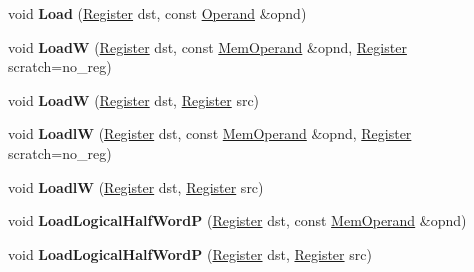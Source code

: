 \begin{DoxyCompactItemize}
void {\bfseries Load} (\mbox{\hyperlink{classv8_1_1internal_1_1Register}{Register}} dst, const \mbox{\hyperlink{classv8_1_1internal_1_1Operand}{Operand}} \&opnd)
\item 
\mbox{\label{classv8_1_1internal_1_1TurboAssembler_afdb1a51d938f30652c45732f9852b8ac}} 
void {\bfseries LoadW} (\mbox{\hyperlink{classv8_1_1internal_1_1Register}{Register}} dst, const \mbox{\hyperlink{classv8_1_1internal_1_1MemOperand}{Mem\+Operand}} \&opnd, \mbox{\hyperlink{classv8_1_1internal_1_1Register}{Register}} scratch=no\+\_\+reg)
\item 
\mbox{\label{classv8_1_1internal_1_1TurboAssembler_a842ef696144bed512dc1a2219dfb05cf}} 
void {\bfseries LoadW} (\mbox{\hyperlink{classv8_1_1internal_1_1Register}{Register}} dst, \mbox{\hyperlink{classv8_1_1internal_1_1Register}{Register}} src)
\item 
\mbox{\label{classv8_1_1internal_1_1TurboAssembler_a7800ca61cc697b18bc92cae0ee6bd5ea}} 
void {\bfseries LoadlW} (\mbox{\hyperlink{classv8_1_1internal_1_1Register}{Register}} dst, const \mbox{\hyperlink{classv8_1_1internal_1_1MemOperand}{Mem\+Operand}} \&opnd, \mbox{\hyperlink{classv8_1_1internal_1_1Register}{Register}} scratch=no\+\_\+reg)
\item 
\mbox{\label{classv8_1_1internal_1_1TurboAssembler_a8e4ca0a38f8dd9f6b69e19e218dfc075}} 
void {\bfseries LoadlW} (\mbox{\hyperlink{classv8_1_1internal_1_1Register}{Register}} dst, \mbox{\hyperlink{classv8_1_1internal_1_1Register}{Register}} src)
\item 
\mbox{\label{classv8_1_1internal_1_1TurboAssembler_ad082c5b7f2f91bc96eca6763722cdc6b}} 
void {\bfseries Load\+Logical\+Half\+WordP} (\mbox{\hyperlink{classv8_1_1internal_1_1Register}{Register}} dst, const \mbox{\hyperlink{classv8_1_1internal_1_1MemOperand}{Mem\+Operand}} \&opnd)
\item 
\mbox{\label{classv8_1_1internal_1_1TurboAssembler_a9bb04b1c3852866b19e296a0c140c9bd}} 
void {\bfseries Load\+Logical\+Half\+WordP} (\mbox{\hyperlink{classv8_1_1internal_1_1Register}{Register}} dst, \mbox{\hyperlink{classv8_1_1internal_1_1Register}{Register}} src)

\end{DoxyCompactItemize}
